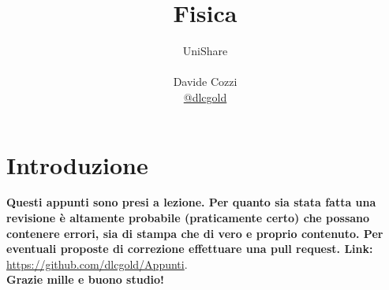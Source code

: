 \documentclass[a4paper,12pt, oneside]{book}
\title{Fisica}
\author{UniShare\\\\Davide Cozzi\\\href{https://t.me/dlcgold}{@dlcgold}}
\date{}
\begin{document}
\maketitle


\newtheorem{teorema}{Teorema}
\newtheorem{definizione}{Definizione}
\newtheorem{esempio}{Esempio}
\newtheorem{corollario}{Corollario}
\newtheorem{lemma}{Lemma}
\newtheorem{osservazione}{Osservazione}
\newtheorem{nota}{Nota}
\newtheorem{esercizio}{Esercizio}
\tableofcontents

\renewcommand{\chaptermark}[1]{%
\markboth{\chaptername
\ \thechapter.\ #1}{}}
\renewcommand{\sectionmark}[1]{\markright{\thesection.\ #1}}

\chapter{Introduzione}
\textbf{Questi appunti sono presi a lezione. Per quanto sia stata fatta una revisione è altamente probabile (praticamente certo) che possano contenere errori, sia di stampa che di vero e proprio contenuto. Per eventuali proposte di correzione effettuare una pull request. Link: } \url{https://github.com/dlcgold/Appunti}.\\
\textbf{Grazie mille e buono studio!}
\end{document}
